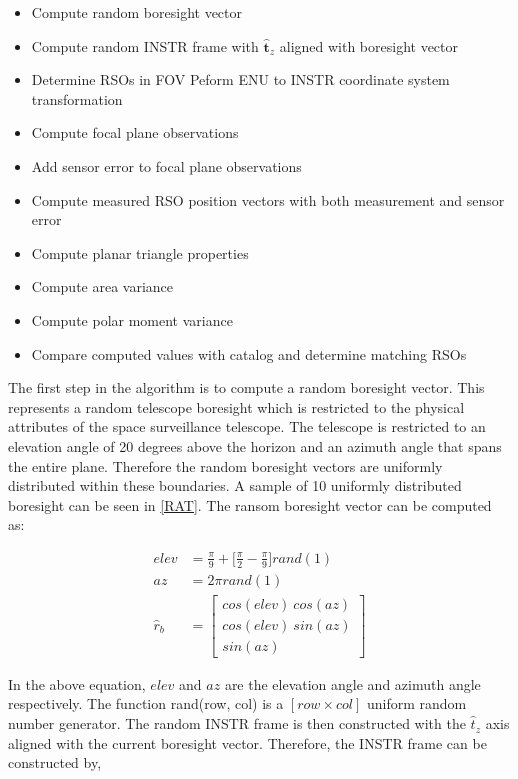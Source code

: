 \documentclass[]{aiaa-tc}%
\begin{document}
\begin{itemize}
\item Compute random boresight vector
\item Compute random INSTR frame with $\hat{\textbf{t}}_z$ aligned with boresight vector
\item Determine RSOs in FOV
Peform ENU to INSTR coordinate system transformation
\item Compute focal plane observations
\item Add sensor error to focal plane observations
\item Compute measured RSO position vectors with both measurement and sensor error
\item Compute planar triangle properties
\item Compute area variance
\item Compute polar moment variance
\item Compare computed values with catalog and determine matching RSOs
\end{itemize}




The first step in the algorithm is to compute a random boresight vector. This represents a random
telescope boresight which is restricted to the physical attributes of the space surveillance telescope. The telescope is restricted to an elevation angle of 20 degrees above the
horizon and an azimuth angle that spans the entire plane. Therefore the random boresight vectors
are uniformly distributed within these boundaries. A sample of 10 uniformly distributed boresight can be seen in \cref{RAT}. The ransom boresight vector can be computed as:

\begin{subequations}
\begin{align}
 elev &= \frac{\pi}{9} +\big[\frac{\pi}{2} -\frac{\pi}{9} \big] rand(1)\\
 az &= 2\pi rand(1)\\
 \hat{r}_b &=  \begin{bmatrix}
  cos(elev) ~cos(az)\\
  cos(elev) ~sin(az)\\
  sin(az) 
 \end{bmatrix} \label{subeqnc}
\end{align}
\end{subequations}

In the above equation, $elev$ and $az$ are the elevation angle and azimuth angle respectively. The function rand(row, col) is a $[row \times col]$ uniform random number generator. The random INSTR frame is then constructed with the $\hat{t}_z$ axis aligned with the current boresight vector. Therefore, the INSTR frame can be constructed by,
\end{document}
